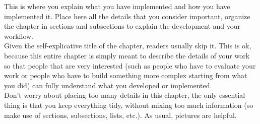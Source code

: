 This is where you explain what you have implemented and how you have implemented it. Place here all the details that you consider important, organize the chapter in sections and subsections to explain the development and your workflow.\\Given the self-explicative title of the chapter, readers usually skip it. This is ok, because this entire chapter is simply meant to describe the details of your work so that people that are very interested (such as people who have to evaluate your work or people who have to build something more complex starting from what you did) can fully understand what you developed or implemented.\\Don't worry about placing too many details in this chapter, the only essential thing is that you keep everything tidy, without mixing too much information (so make use of sections, subsections, lists, etc.). As usual, pictures are helpful.